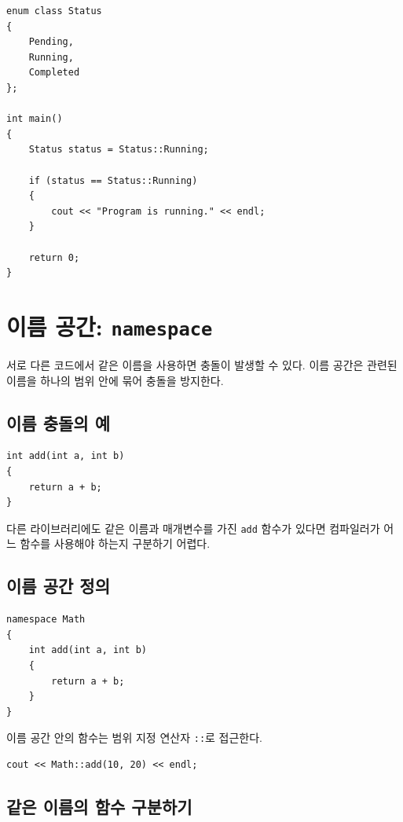 \documentclass[11pt,a4paper]{article}
\begin{document}
\begin{lstlisting}
enum class Status
{
    Pending,
    Running,
    Completed
};

int main()
{
    Status status = Status::Running;

    if (status == Status::Running)
    {
        cout << "Program is running." << endl;
    }

    return 0;
}
\end{lstlisting}

\section{이름 공간: \texttt{namespace}}

서로 다른 코드에서 같은 이름을 사용하면 충돌이 발생할 수 있다.
이름 공간은 관련된 이름을 하나의 범위 안에 묶어 충돌을 방지한다.

\subsection{이름 충돌의 예}

\begin{lstlisting}
int add(int a, int b)
{
    return a + b;
}
\end{lstlisting}

다른 라이브러리에도 같은 이름과 매개변수를 가진 \texttt{add} 함수가 있다면 컴파일러가 어느 함수를 사용해야 하는지 구분하기 어렵다.

\subsection{이름 공간 정의}

\begin{lstlisting}
namespace Math
{
    int add(int a, int b)
    {
        return a + b;
    }
}
\end{lstlisting}

이름 공간 안의 함수는 범위 지정 연산자 \texttt{::}로 접근한다.

\begin{lstlisting}
cout << Math::add(10, 20) << endl;
\end{lstlisting}

\subsection{같은 이름의 함수 구분하기}
\end{document}

